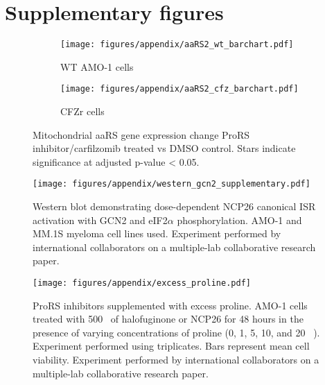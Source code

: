 \chapter{Supplementary figures}

\begin{figure}[h]
\centering
\begin{subfigure}{\textwidth}
    \texttt{[image: figures/appendix/aaRS2\_wt\_barchart.pdf]}
    \caption{WT AMO-1 cells}
\end{subfigure}
\medskip
\begin{subfigure}{\textwidth}
    \texttt{[image: figures/appendix/aaRS2\_cfz\_barchart.pdf]}
    \caption{CFZr cells}
\end{subfigure}
\caption[Mitochndrial aaRS gene expression change]{Mitochondrial aaRS gene expression change ProRS inhibitor/carfilzomib treated vs DMSO control.
Stars indicate significance at adjusted p-value < 0.05.}
\label{fig:ARS2_barchart}
\end{figure}

\begin{figure}[h]
\centering
\texttt{[image: figures/appendix/western\_gcn2\_supplementary.pdf]}
\caption[GCN2 and eIF2$\alpha$ western blot ]{Western blot demonstrating dose-dependent NCP26 canonical ISR activation with GCN2 and eIF2$\alpha$ phosphorylation. AMO-1 and MM.1S myeloma cell lines used.
Experiment performed by international collaborators on a multiple-lab collaborative research paper\cite{bottpreclinical2022}.
}
\label{fig:sup_western}
\end{figure}

\begin{figure}[h]
\centering
\texttt{[image: figures/appendix/excess\_proline.pdf]}
\caption[ProRS inhibitors excess proline]{ProRS inhibitors supplemented with excess proline.
AMO-1 cells treated with 500\si{\nano\Molar} of halofuginone or NCP26 for 48 hours in the presence of varying concentrations of proline (0, 1, 5, 10, and 20 \si{\milli\Molar}).
Experiment performed using triplicates.
Bars represent mean cell viability.
Experiment performed by international collaborators on a multiple-lab collaborative research paper\cite{bottpreclinical2022}.
}
\label{fig:sup_proline_excess}
\end{figure}


